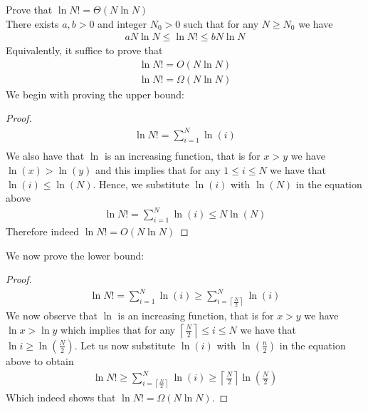 \documentclass[a4paper]{article}
\theoremstyle{plain}
\theoremstyle{definition}
\newtheorem{exmp}{Example}[section]
\theoremstyle{remark}
\begin{document}
\begin{tcolorbox}[colback=black!3!white,colframe=black!60!white,title=\begin{exmp}ln N! \label{ln N!}\end{exmp}]
        Prove that $\ln N! = \Theta(N \ln N)$ \\
	There exists $a,b>0$ and integer $N_0 > 0$ such that for any $N \ge  N_0$ we have
                \begin{align}
                a N \ln N \le  \ln N! \le bN \ln N
                \end{align}
		Equivalently, it suffice to prove that
		\begin{align*}
			\ln N! = O(N \ln N) \\
			\ln N! = \Omega (N \ln N)
		\end{align*}
		We begin with proving the upper bound:
		\begin{proof}
			\begin{align*}
				\ln N! = \sum_{i=1}^{N} \ln(i) \\
			\end{align*}
			We also have that $\ln$ is an increasing function, that is for $x>y$ we have $\ln(x)>\ln(y)$ and this implies that for any $1\le i\le N$ we have that $\ln(i) \le  \ln(N)$. Hence, we substitute $\ln(i)$ with $\ln(N)$ in the equation above
			\begin{align*}
				\ln N! = \sum_{i=1}^{N} \ln(i) \le  N \ln(N)
			\end{align*}
			Therefore indeed $\ln N! = O(N \ln N)$
		\end{proof}
		We now prove the lower bound:
		\begin{proof}
			\begin{align*}
				\ln N! = \sum_{i=1}^{N} \ln(i) \ge  \sum_{i=\left\lceil \frac{N}{2} \right\rceil }^{N} \ln(i)
			\end{align*}
			We now observe that $\ln$ is an increasing function, that is for $x>y$ we have $\ln x > \ln y$ which implies that for any $\left\lceil \frac{N}{2} \right\rceil \le i\le N$ we have that $\ln i \ge  \ln(\frac{N}{2})$. Let us now substitute $\ln(i)$ with $\ln(\frac{n}{2})$ in the equation above to obtain
			\begin{align*}
				\ln N! \ge  \sum_{i=\left\lceil \frac{N}{2} \right\rceil }^{N} \ln(i) \ge \left\lceil \frac{N}{2} \right\rceil \ln(\frac{N}{2})
			\end{align*}
			Which indeed shows that $\ln N! = \Omega (N \ln N)$.
		\end{proof}
\end{tcolorbox}
\end{document}
